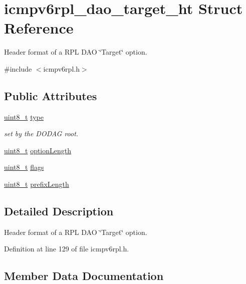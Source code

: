 \hypertarget{structicmpv6rpl__dao__target__ht}{}\section{icmpv6rpl\+\_\+dao\+\_\+target\+\_\+ht Struct Reference}
\label{structicmpv6rpl__dao__target__ht}


Header format of a R\+PL D\+AO \char`\"{}\+Target\char`\"{} option.  




{\ttfamily \#include $<$icmpv6rpl.\+h$>$}

\subsection*{Public Attributes}
\begin{DoxyCompactItemize}
\item 
\hyperlink{_p_e___types_8h_aba7bc1797add20fe3efdf37ced1182c5}{uint8\+\_\+t} \hyperlink{structicmpv6rpl__dao__target__ht_a8b951cda8d1be0ec43b06804ab5cb931}{type}
\begin{DoxyCompactList}\small\item\em set by the D\+O\+D\+AG root. \end{DoxyCompactList}\item 
\hyperlink{_p_e___types_8h_aba7bc1797add20fe3efdf37ced1182c5}{uint8\+\_\+t} \hyperlink{structicmpv6rpl__dao__target__ht_a3bf9ceae9d2d018b75b860d3cc361f29}{option\+Length}
\item 
\hyperlink{_p_e___types_8h_aba7bc1797add20fe3efdf37ced1182c5}{uint8\+\_\+t} \hyperlink{structicmpv6rpl__dao__target__ht_a551706298f953379914116f9a854c1d2}{flags}
\item 
\hyperlink{_p_e___types_8h_aba7bc1797add20fe3efdf37ced1182c5}{uint8\+\_\+t} \hyperlink{structicmpv6rpl__dao__target__ht_a1d933bdc44251a725f47eb2af00ad9be}{prefix\+Length}
\end{DoxyCompactItemize}


\subsection{Detailed Description}
Header format of a R\+PL D\+AO \char`\"{}\+Target\char`\"{} option. 

Definition at line 129 of file icmpv6rpl.\+h.



\subsection{Member Data Documentation}
